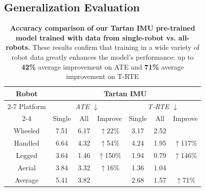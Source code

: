 




\subsection{Generalization Evaluation}
\begin{table}[t]
    \centering
    \small 
    \renewcommand*{\arraystretch}{1}
    \setlength{\tabcolsep}{3pt}
    \begin{tabular}{ c |c c | c | c  c | c }
        \toprule
         Robot & \multicolumn{6}{c}{ Tartan IMU} \\ \cline{2-7} 
         Platform & \multicolumn{3}{c|}{ \textit{ATE $\downarrow$}} & \multicolumn{3}{c}{ \textit{T-RTE $\downarrow$ }} \\ \cline{2-4} \cline{5-7}
         & Single   & All  & Improve & Single  & All & Improve\\ 
        \hline
        Wheeled\cite{zhao2024subt} & 7.51 & 6.17 & \cellcolor{mygreen2!15} {$\uparrow$22\%} & 3.17  & 2.52 & \cellcolor{mygreen2!15}{$\uparrow$26\%} \\
        Handled\cite{sun2021idol} & 6.64 & 4.32 & \cellcolor{mygreen2!15} {$\uparrow$54\%} & 4.24  & 1.95 & \cellcolor{mygreen2!15} {$\uparrow$117\%} \\
        Legged\cite{zhao2024subt}  & 3.64 & 1.46 & \cellcolor{mygreen2!15} {$\uparrow$150\%} & 1.94  & 0.79 & \cellcolor{mygreen2!15} {$\uparrow$146\%} \\
        Aerial\cite{antoniniIJRRblackbird} & 3.84 & 3.32 & \cellcolor{mygreen2!15} {$\uparrow$16\%} & 1.36  & 1.04 & \cellcolor{mygreen2!15}{$\uparrow$30\%} \\ \midrule
        Average & 5.41 & 3.82 & \cellcolor{mygreen2!15}{$\uparrow$42\%} & 2.68  & 1.57 & \cellcolor{mygreen2!15} {$\uparrow$71\%} \\
        \bottomrule
    \end{tabular} 
    \vspace{-2mm}
    \caption{\textbf{Accuracy comparison of our Tartan IMU pre-trained model trained with data from single-robot vs. all-robots.} These results confirm that training in a wide variety of robot data greatly enhances the model’s performance: up to \textbf{42\%} average improvement on ATE and \textbf{71\%} average improvement on T-RTE}
    \label{tab:diverse_data}
    \vspace{-5mm}
\end{table}



